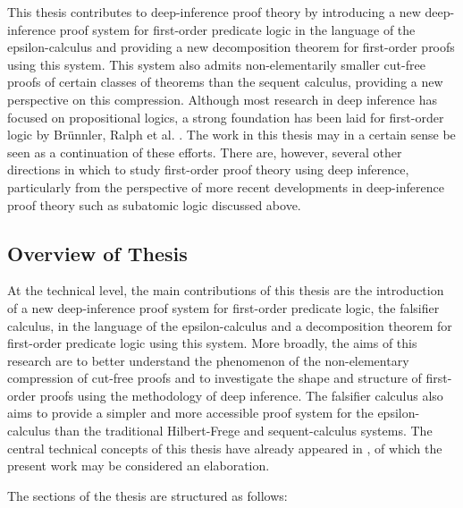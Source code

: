 \documentclass[10pt]{article}
\theoremstyle{definition}\newtheorem{remark}[theorem]{Remark}
\theoremstyle{definition}\newtheorem{example}[theorem]{Example}
\theoremstyle{definition}\newtheorem{definition}[theorem]{Definition}
\begin{document}
	This thesis contributes to deep-inference proof theory by introducing a new deep-inference proof system for first-order predicate logic in the language of the epsilon-calculus and providing a new decomposition theorem for first-order proofs using this system. This system also admits non-elementarily smaller cut-free proofs of certain classes of theorems than the sequent calculus, providing a new perspective on this compression. Although most research in deep inference has focused on propositional logics, a strong foundation has been laid for first-order logic by Brünnler, Ralph et al. \cite{KaiCutElimination, KaiThesis, KaiFinitePremises, BenThesis, BenDecomposingFirstOrderProofs, RalphExpansionProofs, BrunnlerInterpolation}. The work in this thesis may in a certain sense be seen as a continuation of these efforts. There are, however, several other directions in which to study first-order proof theory using deep inference, particularly from the perspective of more recent developments in deep-inference proof theory such as subatomic logic discussed above.
	
	\subsection{Overview of Thesis}
	
	At the technical level, the main contributions of this thesis are the introduction of a new deep-inference proof system for first-order predicate logic, the falsifier calculus, in the language of the epsilon-calculus and a decomposition theorem for first-order predicate logic using this system. More broadly, the aims of this research are to better understand the phenomenon of the non-elementary compression of cut-free proofs and to investigate the shape and structure of first-order proofs using the methodology of deep inference. The falsifier calculus also aims to provide a simpler and more accessible proof system for the epsilon-calculus than the traditional Hilbert-Frege and sequent-calculus systems. The central technical concepts of this thesis have already appeared in \cite{AllettLICS}, of which the present work may be considered an elaboration.
	
	The sections of the thesis are structured as follows:
	
\end{document}
